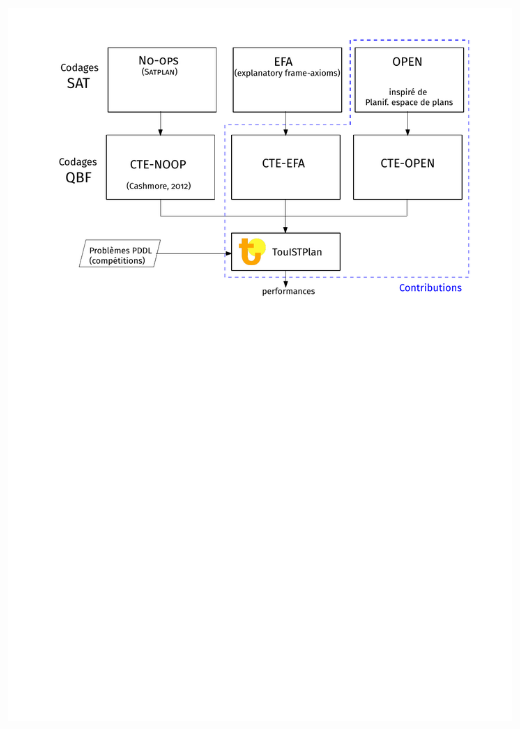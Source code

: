 \documentclass[english,french,usenames,dvipsnames]{beamer}
\begin{document}
\begin{frame}
\includegraphics[width=1\textwidth]{figures/coplas2018/cte-encodings-3.pdf}
\end{frame}
\end{document}
